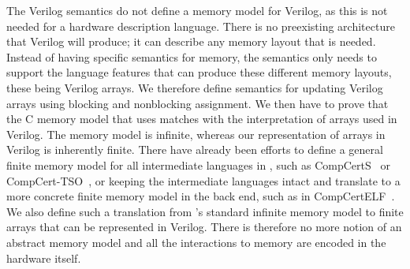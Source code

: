 The Verilog semantics do not define a memory model for Verilog, as this is not
needed for a hardware description language.  There is no preexisting
architecture that Verilog will produce; it can describe any memory layout that
is needed.  Instead of having specific semantics for memory, the semantics only
needs to support the language features that can produce these different memory
layouts, these being Verilog arrays.  We therefore define semantics for updating
Verilog arrays using blocking and nonblocking assignment.  We then have to prove
that the C memory model that \compcert{} uses matches with the interpretation of
arrays used in Verilog.  The \compcert{} memory model is infinite, whereas our
representation of arrays in Verilog is inherently finite.  There have already
been efforts to define a general finite memory model for all intermediate
languages in \compcert{}, such as CompCertS~\cite{besson18_compc} or
CompCert-TSO~\cite{sevcik13_compc}, or keeping the intermediate languages intact
and translate to a more concrete finite memory model in the back end, such as in
Comp\-Cert\-ELF~\cite{wang20_compc}.  We also define such a translation from
\compcert{}'s standard infinite memory model to finite arrays that can be
represented in Verilog.  There is therefore no more notion of an abstract memory
model and all the interactions to memory are encoded in the hardware itself.


